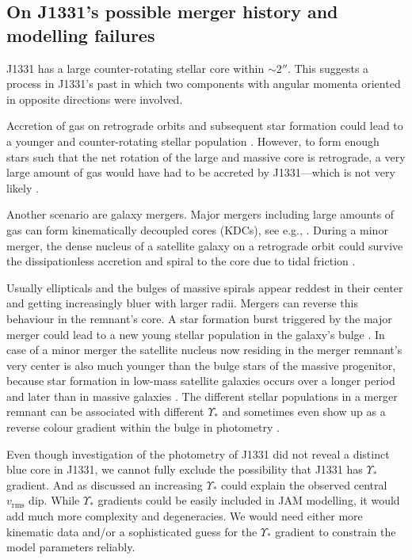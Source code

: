 \subsection{On J1331's possible merger history and modelling failures}

J1331 has a large counter-rotating stellar core within $\sim 2''$. This suggests a process in J1331's past in which two components with angular momenta oriented in opposite directions were involved.

Accretion of gas on retrograde orbits and subsequent star formation could lead to a younger and counter-rotating stellar population \Wilma{[TO DO: REF]}. However, to form enough stars such that the net rotation of the large and massive core is retrograde, a very large amount of gas would have had to be accreted by J1331---which is not very likely \Wilma{[TO DO: REF]}. 

Another scenario are galaxy mergers. Major mergers including large amounts of gas can form kinematically decoupled cores (KDCs), see e.g., . During a minor merger, the dense nucleus of a satellite galaxy on a retrograde orbit could survive the dissipationless accretion and spiral to the core due to tidal friction \citep{1984ApJ...287..577K}. 

Usually ellipticals and the bulges of massive spirals appear reddest in their center and getting increasingly bluer with larger radii. Mergers can reverse this behaviour in the remnant's core. A star formation burst triggered by the major merger could lead to a new young stellar population in the galaxy's bulge . In case of a minor merger the satellite nucleus now residing in the merger remnant's very center is also much younger than the bulge stars of the massive progenitor, because star formation in low-mass satellite galaxies occurs over a longer period and later than in massive galaxies \Wilma{[TO DO: REF]}. The different stellar populations in a merger remnant can be associated with different $\Upsilon_*$ and sometimes even show up as a reverse colour gradient within the bulge in photometry \Wilma{[TO DO: REF]}.

Even though investigation of the photometry of J1331 did not reveal a distinct blue core in J1331, we cannot fully exclude the possibility that J1331 has $\Upsilon_*$ gradient. And as discussed \Wilma{[TO DO: Where???]} an increasing $\Upsilon_*$ could explain the observed central $v_\text{rms}$ dip. While $\Upsilon_*$ gradients could be easily included in JAM modelling, it would add much more complexity and degeneracies. We would need either more kinematic data and/or a sophisticated guess for the $\Upsilon_*$ gradient to constrain the model parameters reliably.

